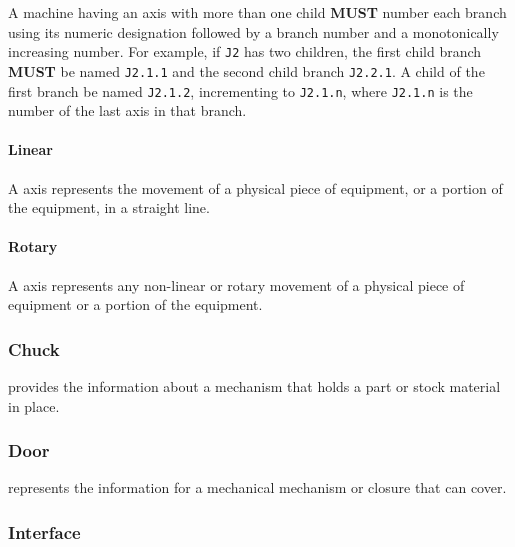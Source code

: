 A machine having an axis with more than one child \textbf{MUST} number each branch using its numeric designation followed by a branch number and a monotonically increasing number. For example, if \texttt{J2} has two children, the first child branch \textbf{MUST} be named \texttt{J2.1.1} and the second child branch \texttt{J2.2.1}. A child of the first branch \MUST be named \texttt{J2.1.2}, incrementing to \texttt{J2.1.n}, where \texttt{J2.1.n} is the number of the last axis in that branch.

\paragraph{Linear}\mbox{}
\label{sec:Linear}


A  axis represents the movement of a physical piece of equipment, or a portion of the equipment, in a straight line. 



\paragraph{Rotary}\mbox{}
\label{sec:Rotary}


A  axis represents any non-linear or rotary movement of a physical piece of equipment or a portion of the equipment.



\subsubsection{Chuck}
\label{sec:Chuck}



 provides the information about a mechanism that holds a part or stock material in place.



\subsubsection{Door}
\label{sec:Door}



 represents the information for a mechanical mechanism or closure that can cover.



\subsubsection{Interface}
\label{sec:Interface}



